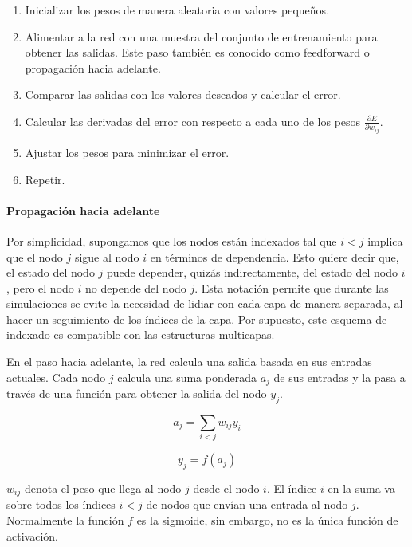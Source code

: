 \begin{enumerate}
    \item Inicializar los pesos de manera aleatoria con valores pequeños.
    \item Alimentar a la red con una muestra del conjunto de entrenamiento para obtener las salidas. Este paso 
    también es conocido como feedforward o propagación hacia adelante.
    \item Comparar las salidas con los valores deseados y calcular el error.
    \item Calcular las derivadas del error con respecto a cada uno de los pesos $\frac{\partial E}{\partial w_{ij}}$.
    \item Ajustar los pesos para minimizar el error.
    \item Repetir.
\end{enumerate}




\paragraph{Propagación hacia adelante}
Por simplicidad, supongamos que los nodos están indexados tal que $i < j$ implica que 
el nodo $j$ sigue al nodo $i$ en términos de dependencia. Esto quiere decir que,
el estado del nodo $j$ puede depender, quizás indirectamente, del estado 
del nodo $i$, pero el nodo $i$ no depende del nodo $j$. Esta notación permite que durante
las simulaciones se evite la necesidad de lidiar con cada capa de manera separada,
al hacer un seguimiento de los índices de la capa. Por supuesto, este esquema de
indexado es compatible con las estructuras multicapas.

En el paso hacia adelante, la red calcula una salida basada en sus entradas actuales. Cada nodo
$j$ calcula una suma ponderada $a_j$ de sus entradas y la pasa a través de una función
para obtener la salida del nodo $y_j$.

\[
a_j = \sum_{i < j} w_{ij} y_i
\]

\[
y_j = f(a_j)
\]

$w_{ij}$ denota el peso que llega al nodo $j$ desde el nodo $i$. El índice $i$ en la suma
va sobre todos los índices $i < j$ de nodos que envían una entrada al nodo $j$. Normalmente
la función $f$ es la sigmoide, sin embargo, no es la única función de activación.

